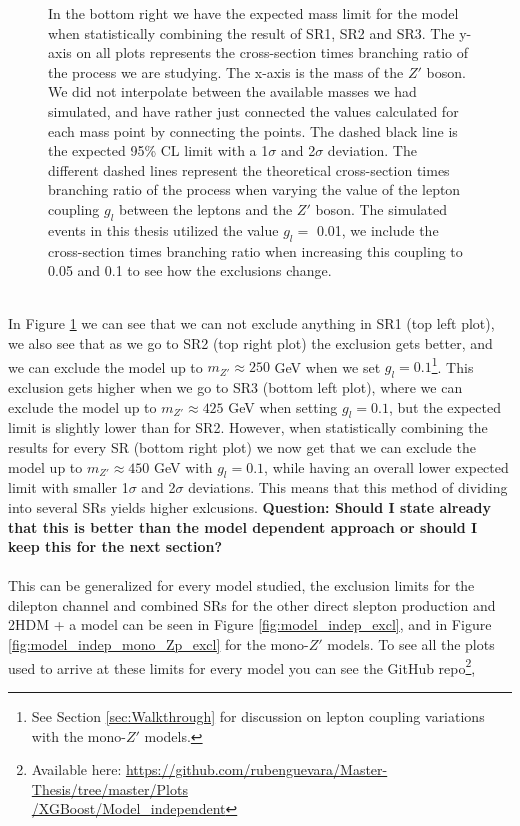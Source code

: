 \documentclass[12pt, a4paper]{book}
\begin{document}
\begin{figure}[!ht]
{   In the bottom right we have the expected mass limit for the model when statistically combining the result of SR1, SR2 and SR3. 
   The y-axis on all plots represents the cross-section times branching ratio of the process we are studying. The x-axis is the mass of the $Z'$ boson. We did not interpolate between the available masses we had simulated, 
   and have rather just connected the values calculated for each mass point by connecting the points. The dashed black line is the expected 95\% CL limit with a 1$\sigma$ and 2$\sigma$ deviation. 
   The different dashed lines represent the theoretical cross-section times branching ratio of the process when varying the value of the lepton coupling $g_l$ between the leptons and the $Z'$ boson. The simulated events in this thesis utilized the value $g_l=$ 0.01, we include the cross-section times branching ratio when increasing this coupling to 0.05 and 0.1 to see how the exclusions change. }\label{fig:DH_HDS_me_SRS}
\end{figure} 
\\In Figure \ref{fig:DH_HDS_me_SRS} we can see that we can not exclude anything in SR1 (top left plot), we also see that as we go to SR2 (top right plot) the exclusion gets better, and we can exclude the model up to $m_{Z'}\approx250$ GeV when we set $g_l=0.1$\footnote{See Section \ref{sec:Walkthrough} for discussion on lepton coupling variations with the mono-$Z'$ models.}. 
This exclusion gets higher when we go to SR3 (bottom left plot), where we can exclude the model up to $m_{Z'}\approx425$ GeV when setting $g_l=0.1$, but the expected limit is slightly lower than for SR2. However, when statistically combining the results for every SR (bottom right plot) we now get that we can exclude the model up to $m_{Z'}\approx450$ GeV with $g_l=0.1$,
while having an overall lower expected limit with smaller 1$\sigma$ and 2$\sigma$ deviations. This means that this method of dividing into several SRs yields higher exlcusions. \textbf{Question: Should I state already that this is better than the model dependent approach or should I keep this for the next section?}\\
\\ This can be generalized for every model studied, the exclusion limits for the dilepton channel and combined SRs for the other direct slepton production and 2HDM + a model can be seen in Figure \ref{fig:model_indep_excl}, and in Figure \ref{fig:model_indep_mono_Zp_excl} for the mono-$Z'$ models.
To see all the plots used to arrive at these limits for every model you can see the GitHub repo\footnote{Available here: \href{https://github.com/rubenguevara/Master-Thesis/tree/master/Plots/XGBoost/Model_independent}{https://github.com/rubenguevara/Master-Thesis/tree/master/Plots\\/XGBoost/Model\_independent}}, 
\end{document}
